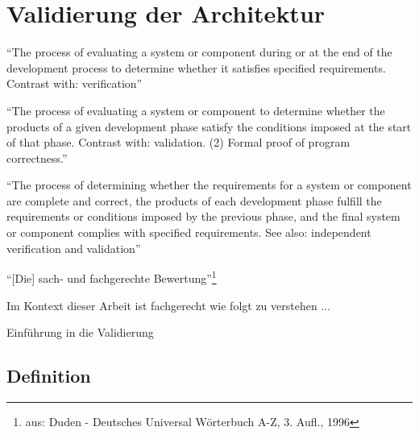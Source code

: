 
\chapter{Validierung der Architektur} %
\label{cha:validierung_der_architektur}

  \begin{definition}[Validierung]\label{def:validierung}
    "`The process of evaluating a system or component during or at the end of the development process to determine whether it satisfies specified requirements. Contrast with: verification"'~\emph{\citep{ieee90sg}}
  \end{definition}
  
  \begin{definition}[Verifikation]\label{def:verifikation}
    "`The process of evaluating a system or component to determine whether the products of a given development phase satisfy the conditions imposed at the start of that phase. Contrast with: validation. (2) Formal proof of program correctness."'~\emph{\citep{ieee90sg}}
  \end{definition}
  
  \begin{definition}\label{def:verifikation_und_validierung_vv}
    "`The process of determining whether the requirements for a system or component are complete and correct, the products of each development phase fulfill the requirements or conditions imposed by the previous phase, and the final system or component complies with specified requirements. See also: independent verification and validation"'~\emph{\citep{ieee90sg}}
  \end{definition}
  
  \begin{definition}[Evaluation]\label{def:evaluation}
    "`[Die] sach- und fachgerechte Bewertung"'\footnote{aus: Duden - Deutsches Universal Wörterbuch A-Z, 3. Aufl., 1996}
  \end{definition}
  
  Im Kontext dieser Arbeit ist fachgerecht wie folgt zu verstehen ...

  Einführung in die Validierung~\citep{balzert1998lst}
  
\section{Definition} %
\label{sec:definition}

